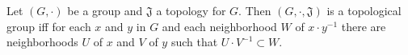 Let $(G, \cdot)$ be a group and $\mathfrak{J}$ a topology for $G$. Then $(G, \cdot, \mathfrak{J})$ is a topological group iff for each $x$ and $y$ in $G$ and each neighborhood $W$ of $x \cdot y^{-1}$ there are neighborhoods $U$ of $x$ and $V$ of $y$ such that $U \cdot V^{-1} \subset W$.
